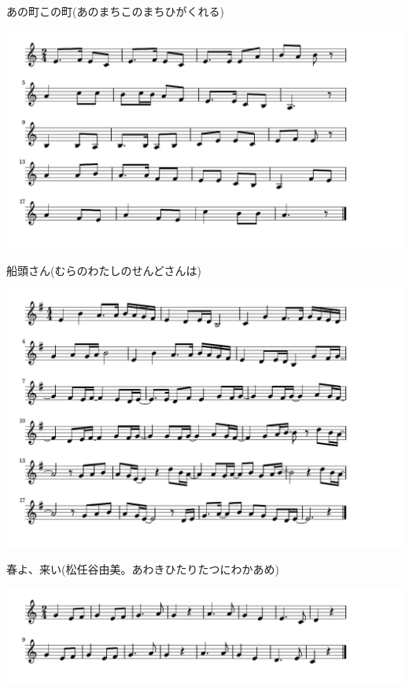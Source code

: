 \documentclass[a4paper]{ltjsarticle}
\begin{document}
\vspace{-10mm} \hspace{10mm}
あの町この町(あのまちこのまちひがくれる)

\includegraphics[clip]{sendo_crop.pdf}

\vspace{-10mm} \hspace{10mm}
船頭さん(むらのわたしのせんどさんは)

\includegraphics[clip]{haruyokoimatsutoya_crop.pdf}

\vspace{-10mm} \hspace{10mm}
春よ、来い(松任谷由美。あわきひたりたつにわかあめ)

\includegraphics[clip]{takotako_crop.pdf}
\end{document}
